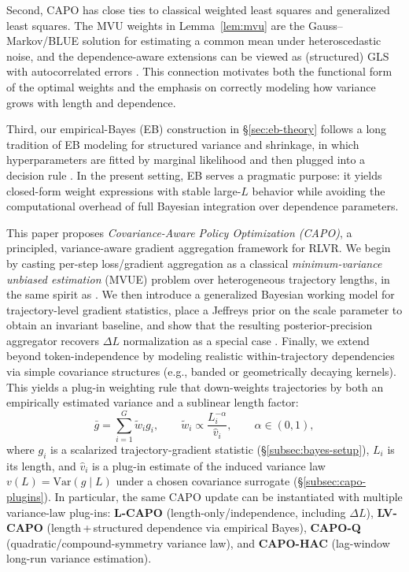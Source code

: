 Second, CAPO has close ties to classical weighted least squares and generalized least squares.
The MVU weights in Lemma~\ref{lem:mvu} are the Gauss--Markov/BLUE solution for estimating a common mean under heteroscedastic noise, and the dependence-aware extensions can be viewed as (structured) GLS with autocorrelated errors \citep{hamilton1994time}.
This connection motivates both the functional form of the optimal weights and the emphasis on correctly modeling how variance grows with length and dependence.

Third, our empirical-Bayes (EB) construction in \S\ref{sec:eb-theory} follows a long tradition of EB modeling for structured variance and shrinkage, in which hyperparameters are fitted by marginal likelihood and then plugged into a decision rule \citep{efron2012large}.
In the present setting, EB serves a pragmatic purpose: it yields closed-form weight expressions with stable large-$L$ behavior while avoiding the computational overhead of full Bayesian integration over dependence parameters.

This paper proposes \emph{Covariance-Aware Policy Optimization (CAPO)}, a principled, variance-aware gradient aggregation framework for RLVR. We begin by casting per-step loss/gradient aggregation as a classical \emph{minimum-variance unbiased estimation} (MVUE) problem over heterogeneous trajectory lengths, in the same spirit as \citet{he2025deltal}. We then introduce a generalized Bayesian working model for trajectory-level gradient statistics, place a Jeffreys prior on the scale parameter to obtain an invariant baseline, and show that the resulting posterior-precision aggregator recovers $\Delta L$ normalization as a special case \citep{jeffreys1946invariant,he2025deltal}. Finally, we extend beyond token-independence by modeling realistic within-trajectory dependencies via simple covariance structures (e.g., banded or geometrically decaying kernels). This yields a plug-in weighting rule that down-weights trajectories by both an empirically estimated variance and a sublinear length factor:
\begin{equation}
\label{eq:capo-agg}
\bar g = \sum_{i=1}^{G} \tilde w_i g_i,
\qquad
\tilde w_i \propto \frac{L_i^{-\alpha}}{\widehat{v}_i},
\qquad
\alpha \in (0,1),
\end{equation}
where $g_i$ is a scalarized trajectory-gradient statistic (\S\ref{subsec:bayes-setup}), $L_i$ is its length, and $\widehat{v}_i$ is a plug-in estimate of the induced variance law $v(L)=\mathrm{Var}(g\mid L)$ under a chosen covariance surrogate (\S\ref{subsec:capo-plugins}). In particular, the same CAPO update can be instantiated with multiple variance-law plug-ins: \textbf{L-CAPO} (length-only/independence, including $\Delta L$), \textbf{LV-CAPO} (length\,+\,structured dependence via empirical Bayes), \textbf{CAPO-Q} (quadratic/compound-symmetry variance law), and \textbf{CAPO-HAC} (lag-window long-run variance estimation).

